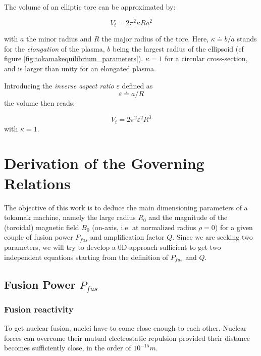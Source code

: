 The volume of an elliptic tore can be approximated by:

\begin{equation}
V_t = 2\pi^2 \kappa R a^2
\end{equation}

\noindent
with $a$ the minor radius and $R$ the major radius of the tore. Here, $\kappa \doteq b/a$ stands for the \textit{elongation} of the plasma, $b$ being the largest radius of the ellipsoid (cf figure \ref{fig:tokamakequilibrium_parameters}). $\kappa=1$ for a circular cross-section, and is larger than unity for an elongated plasma.

Introducing the \textit{inverse aspect ratio} $\varepsilon$ defined as 
\begin{equation}
	\varepsilon  \doteq a /R
\end{equation}
the volume then reads:

\begin{equation}
V_t = 2\pi^2\varepsilon^2 R^3
\label{eq:tore_volume}
\end{equation}
\noindent
with $\kappa=1$. 


\newpage
\chapter{Derivation of the Governing Relations}\margintoc
The objective of this work is to deduce the main dimensioning parameters of a tokamak machine, namely the large radius $R_0$ and the magnitude of the (toroidal) magnetic field $B_0$ (on-axis, i.e. at normalized radius $\rho=0$) for a given couple of fusion power $P_{fus}$ and amplification factor $Q$. Since we are seeking two parameters, we will try to develop a 0D-approach sufficient to get two independent equations starting from the definition of $P_{fus}$ and $Q$. 





\section{Fusion Power $P_{fus}$}
\subsection{Fusion reactivity}
To get nuclear fusion, nuclei have to come close enough to each other. Nuclear forces can overcome their mutual electrostatic repulsion provided their distance becomes sufficiently close, in the order of $\si{10^{-15}m}$. %

